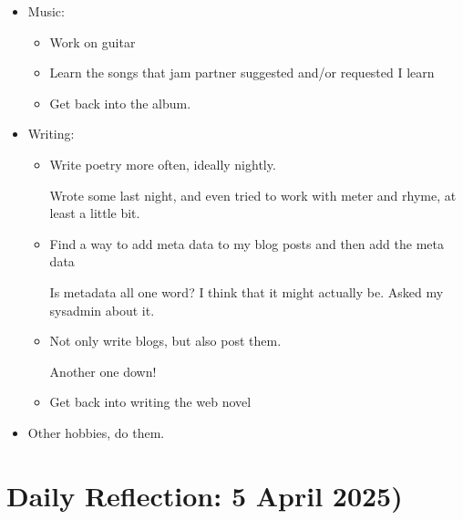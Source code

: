 \documentclass[12pt]{article}[titlepage]
\renewcommand{\,}{\textsuperscript{,}}
\begin{document}
\begin{itemize}
\begin{itemize}
\begin{itemize}
Did no reading yesterday, which I don't love, but I was also very tired.\footnote{as evidenced by my sleeping all the way until the overly generous alarm I set.  }
\item Read more poetry.  
  
I wrote some! That's better than nothing.  
\end{itemize}

\item Music:   
\begin{itemize}   
\item Work on guitar  
\item Learn the songs that jam partner suggested and/or requested I learn  
\item Get back into the album.  
\end{itemize}   
\item Writing:  
\begin{itemize}   
\item Write poetry more often, ideally nightly.  
  
Wrote some last night, and even tried to work with meter and rhyme, at least a little bit.  
\item Find a way to add meta data to my blog posts and then add the meta data  
  
Is metadata all one word? I think that it might actually be. Asked my sysadmin about it.  
\item Not only write blogs, but also post them.  
  
Another one down!  
\item Get back into writing the web novel  
\end{itemize}   
\item Other hobbies, do them.  
\end{itemize}
\end{itemize}

\section{Daily Reflection: 5 April 2025)}
\end{document}
